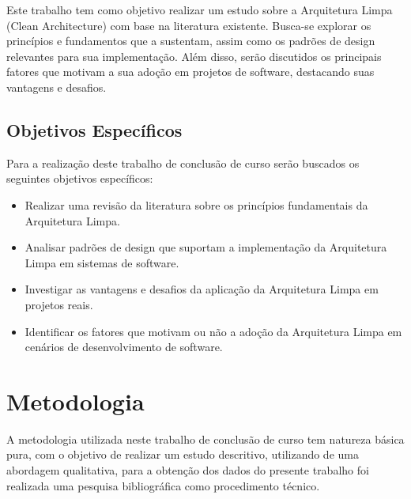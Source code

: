             \par Este trabalho tem como objetivo realizar um estudo sobre a Arquitetura Limpa (Clean Architecture) com base na literatura existente. Busca-se explorar os princípios e fundamentos que a sustentam, assim como os padrões de design relevantes para sua implementação. Além disso, serão discutidos os principais fatores que motivam a sua adoção em projetos de software, destacando suas vantagens e desafios.

        \subsection{Objetivos Específicos}
            \par Para a realização deste trabalho de conclusão de curso serão buscados os seguintes objetivos específicos:

            \begin{itemize}

                \item Realizar uma revisão da literatura sobre os princípios fundamentais da Arquitetura Limpa.

                \item Analisar padrões de design que suportam a implementação da Arquitetura Limpa em sistemas de software.

                \item Investigar as vantagens e desafios da aplicação da Arquitetura Limpa em projetos reais.

                \item Identificar os fatores que motivam ou não a adoção da Arquitetura Limpa em cenários de desenvolvimento de software.

            \end{itemize}
            
    \section{Metodologia}
        \par A metodologia utilizada neste trabalho de conclusão de curso tem natureza básica pura, com o objetivo de realizar um estudo descritivo, utilizando de uma abordagem qualitativa, para a obtenção dos dados do presente trabalho foi realizada uma pesquisa bibliográfica como procedimento técnico.
        